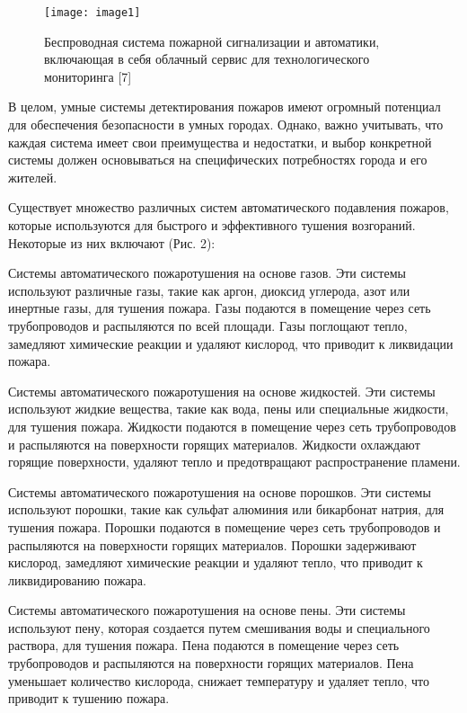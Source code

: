 \begin{figure}[H]
\centering
\texttt{[image: image1]}
\caption{Беспроводная система пожарной сигнализации и автоматики,
включающая в себя облачный сервис для технологического мониторинга
{[}7{]}}
\end{figure}

\begin{multicols}{2}
В целом, умные системы детектирования пожаров имеют огромный потенциал
для обеспечения безопасности в умных городах. Однако, важно учитывать,
что каждая система имеет свои преимущества и недостатки, и выбор
конкретной системы должен основываться на специфических потребностях
города и его жителей.

Существует множество различных систем автоматического подавления
пожаров, которые используются для быстрого и эффективного тушения
возгораний. Некоторые из них включают (Рис. 2):

Системы автоматического пожаротушения на основе газов. Эти системы
используют различные газы, такие как аргон, диоксид углерода, азот или
инертные газы, для тушения пожара. Газы подаются в помещение через
сеть трубопроводов и распыляются по всей площади. Газы поглощают
тепло, замедляют химические реакции и удаляют кислород, что приводит к
ликвидации пожара.

Системы автоматического пожаротушения на основе жидкостей. Эти системы
используют жидкие вещества, такие как вода, пены или специальные
жидкости, для тушения пожара. Жидкости подаются в помещение через сеть
трубопроводов и распыляются на поверхности горящих материалов.
Жидкости охлаждают горящие поверхности, удаляют тепло и предотвращают
распространение пламени.

Системы автоматического пожаротушения на основе порошков. Эти системы
используют порошки, такие как сульфат алюминия или бикарбонат натрия,
для тушения пожара. Порошки подаются в помещение через сеть
трубопроводов и распыляются на поверхности горящих материалов. Порошки
задерживают кислород, замедляют химические реакции и удаляют тепло,
что приводит к ликвидированию пожара.

Системы автоматического пожаротушения на основе пены. Эти системы
используют пену, которая создается путем смешивания воды и
специального раствора, для тушения пожара. Пена подаются в помещение
через сеть трубопроводов и распыляются на поверхности горящих
материалов. Пена уменьшает количество кислорода, снижает температуру и
удаляет тепло, что приводит к тушению пожара.

\end{multicols}

